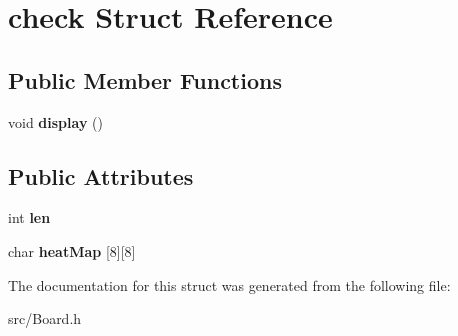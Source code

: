 \hypertarget{structcheck}{}\section{check Struct Reference}
\label{structcheck}
\subsection*{Public Member Functions}
\begin{DoxyCompactItemize}
\item 
\mbox{\label{structcheck_aed4f12a675b5f11aa8cf8891024a7ed1}} 
void {\bfseries display} ()
\end{DoxyCompactItemize}
\subsection*{Public Attributes}
\begin{DoxyCompactItemize}
\item 
\mbox{\label{structcheck_a004e9a83f3635e9ec1e40c98d3ba0519}} 
int {\bfseries len}
\item 
\mbox{\label{structcheck_a20edc7f43122fbfd399629ed8b41dc6a}} 
char {\bfseries heat\+Map} \mbox{[}8\mbox{]}\mbox{[}8\mbox{]}
\end{DoxyCompactItemize}


The documentation for this struct was generated from the following file\+:\begin{DoxyCompactItemize}
\item 
src/Board.\+h\end{DoxyCompactItemize}
